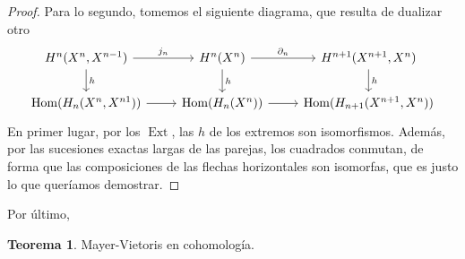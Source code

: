 \documentclass[spanish]{book}
\theoremstyle{definition}
\newtheorem*{teo}{Teorema}
\DeclareMathOperator{\Hom}{Hom}
\DeclareMathOperator{\Ext}{Ext}
\begin{document}
\begin{proof}
	Para lo segundo, tomemos el siguiente diagrama, que resulta de dualizar otro
	\[\begin{tikzcd}
		H^n(X^n,X^{n-1})\arrow[r,"j_n"]\arrow[d,"h"]&H^n(X^n)\arrow[r,"\partial_n"]\arrow[d,"h"]&H^{n+1}(X^{n+1},X^n)\arrow[d,"h"]\\
		\Hom(H_n(X^n,X^{n1}))\arrow[r]&\Hom(H_n(X^n))\arrow[r]&\Hom(H_{n+1}(X^{n+1},X^n))
	\end{tikzcd}\]
	En primer lugar, por los $\Ext$, las $h$ de los extremos son isomorfismos. Además, por las sucesiones exactas largas de las parejas, los cuadrados conmutan, de forma que las composiciones de las flechas horizontales son isomorfas, que es justo lo que queríamos demostrar.
\end{proof}
Por último,
\begin{teo}
	Mayer-Vietoris en cohomología.
\end{teo}
\end{document}
